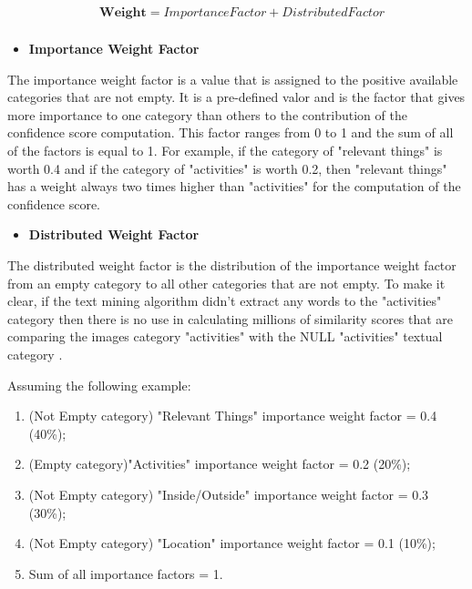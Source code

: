     \begin{align*}
      &\textbf{Weight}  =   ImportanceFactor + DistributedFactor \\ 
  \end{align*}

    
    \begin{itemize}
      \item \textbf{Importance Weight Factor}
    \end{itemize}

    The importance weight factor is a value that is assigned to the positive available categories that are not empty. It is a pre-defined valor and is the factor that gives more importance to one category than others to the contribution of the confidence score computation. This factor ranges from 0 to 1 and the sum of all of the factors is equal to 1. For example, if the category of "relevant things" is worth 0.4 and if the category of "activities" is worth 0.2, then "relevant things" has a weight always two times higher than "activities" for the computation of the confidence score.

    \begin{itemize}
      \item \textbf{Distributed Weight Factor}
    \end{itemize}

    The distributed weight factor is the distribution of the importance weight factor from an empty category to all other categories that are not empty. To make it clear, if the text mining algorithm didn't extract any words to the "activities" category then there is no use in calculating millions of similarity scores that are comparing the images category "activities" with the NULL "activities" textual category . 

        
   Assuming the following example:
   \begin{enumerate}
    \item (Not Empty category) "Relevant Things" importance weight factor = 0.4 (40\%);
    \item (Empty category)"Activities" importance weight factor =  0.2 (20\%);
    \item (Not Empty category) "Inside/Outside" importance weight factor = 0.3 (30\%);
    \item (Not Empty category) "Location" importance weight factor = 0.1 (10\%);
    \item Sum of all importance factors = 1.
   \end{enumerate}

